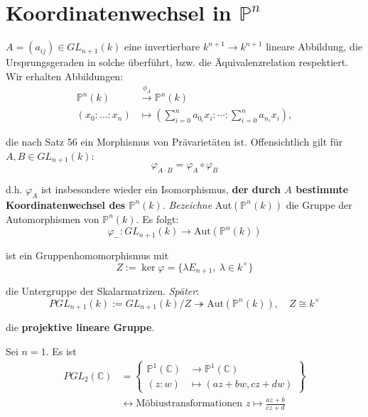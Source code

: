 
\section{Koordinatenwechsel in $\mathbb{P}^{n}$}
\label{sec:koordinatenwechsel-projektiver-raum}

$A=(a_{ij})\in GL_{n+1}(k)$ eine invertierbare $k^{n+1}\rightarrow k^{n+1}$
lineare Abbildung, die Ursprungsgeraden in solche überführt, bzw.
die Äquivalenzrelation respektiert. Wir erhalten Abbildungen:
\begin{align*}
  \mathbb{P}^{n}(k) & \overset{\phi_{A}}{\longrightarrow}\mathbb{P}^{n}(k)\\
  (x_{0}:\ldots:x_{n}) & \longmapsto\left(\sum_{i=0}^{n}a_{0_{i}}x_{i}:\cdots:\sum_{i=0}^{n}a_{n_{i}}x_{i}\right),
\end{align*}

die nach Satz 56 ein Morphismus von Prävarietäten ist. Offensichtlich
gilt für $A,B\in GL_{n+1}(k)$:
\[
  \varphi_{A\cdot B}=\varphi_{A}\circ\varphi_{B}
\]

d.h. $\varphi_{A}$ ist insbesondere wieder ein Isomorphismus, \textbf{der
  durch $A$ bestimmte Koordinatenwechsel des $\mathbb{P}^{n}(k)$}.
\emph{Bezeichne} Aut$(\mathbb{P}^{n}(k))$ die Gruppe der Automorphismen
von $\mathbb{P}^{n}(k)$. Es folgt:
\[
  \varphi_{-}:GL_{n+1}(k)\rightarrow\text{Aut}(\mathbb{P}^{n}(k))
\]

ist ein Gruppenhomomorphismus mit 
\[
  Z:=\ker\varphi=\{\lambda E_{n+1},\ \lambda\in k^{\times}\}
\]

die Untergruppe der Skalarmatrizen. \emph{Später}:
\[
  PGL_{n+1}(k):=GL_{n+1}(k)/Z\twoheadrightarrow\text{Aut}(\mathbb{P}^{n}(k)),\quad Z\cong k^{\times}
\]

die \textbf{projektive lineare Gruppe}.
\begin{example*}
Sei $n=1$. Es ist
\begin{align*}
PGL_{2}(\mathbb{C}) & =\left\{ \begin{array}{rl}
\mathbb{P}^{1}(\mathbb{C}) & \rightarrow\mathbb{P}^{1}(\mathbb{C})\\
(z:w) & \mapsto(az+bw,cz+dw)
\end{array}\right\} \\
 & \leftrightarrow\text{Möbiustransformationen }z\mapsto\frac{az+b}{cz+d}
\end{align*}
\end{example*}

